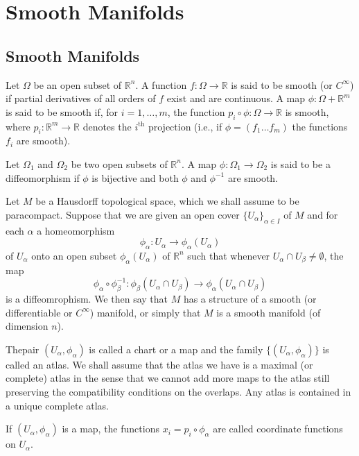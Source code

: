\chapter{Smooth Manifolds}\label{chap1}

\section*{Smooth Manifolds}\pageoriginale

Let $\Omega$ be an open subset of $\mathbb{R}^{n}$. A function $f:\Omega\to \mathbb{R}$ is said to be smooth (or $C^{\infty}$) if partial derivatives of all orders of $f$ exist and are continuous. A map $\phi:\Omega+\mathbb{R}^{m}$ is said to be smooth if, for $i=1,\ldots,m$, the function $p_{i}\circ \phi :\Omega\to \mathbb{R}$ is smooth, where $p_{i}:\mathbb{R}^{m}\to \mathbb{R}$ denotes the $i^{\text{th}}$ projection (i.e., if $\phi=(f_{1}\ldots f_{m})$ the functions $f_{i}$ are smooth).

Let $\Omega_{1}$ and $\Omega_{2}$ be two open subsets of $\mathbb{R}^{n}$. A map $\phi:\Omega_{1}\to \Omega_{2}$ is said to be a diffeomorphism if $\phi$ is bijective and both $\phi$ and $\phi^{-1}$ are smooth.

Let $M$ be a Hausdorff topological space, which we shall assume to be paracompact. Suppose that we are given an open cover $\{U_{\alpha}\}_{\alpha\in I}$ of $M$ and for each $\alpha$ a homeomorphism
$$
\phi_{\alpha}:U_{\alpha}\to \phi_{\alpha}(U_{\alpha})
$$
of $U_{\alpha}$ onto an open subset $\phi_{\alpha}(U_{\alpha})$ of $\mathbb{R}^{n}$ such that whenever $U_{\alpha}\cap U_{\beta}\neq \emptyset$, the map
$$
\phi_{\alpha}\circ \phi^{-1}_{\beta} : \phi_{\beta}\left(U_{\alpha}\cap U_{\beta}\right)\to \phi_{\alpha}\left(U_{\alpha}\cap U_{\beta}\right)
$$
is a diffeomrophism. We then say that $M$ has a structure of a smooth (or differentiable or $C^{\infty}$) manifold, or simply that $M$ is a smooth manifold (of dimension $n$).

The\pageoriginale pair $(U_{\alpha},\phi_{\alpha})$ is called a chart or a map and the family $\{(U_{\alpha},\phi_{\alpha})\}$ is called an atlas. We shall assume that the atlas we have is a maximal (or complete) atlas in the sense that we cannot add more maps to the atlas still preserving the compatibility conditions on the overlaps. Any atlas is contained in a unique complete atlas. 

If $(U_{\alpha},\phi_{\alpha})$ is a map, the functions $x_{i}=p_{i}\circ \phi_{\alpha}$ are called coordinate functions on $U_{\alpha}$.

